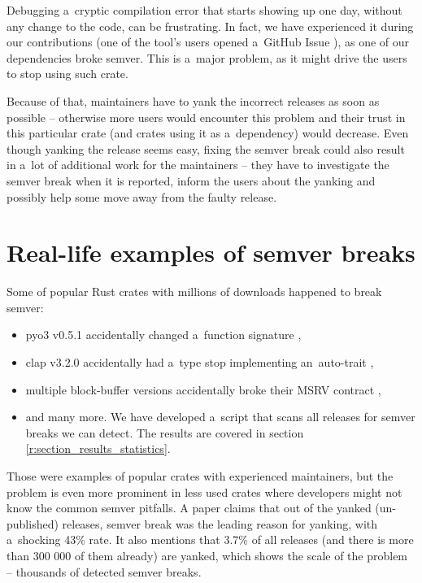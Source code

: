 \documentclass[licencjacka,en]{pracamgr}
\begin{document}
Debugging a~cryptic compilation error that starts showing up one day,
without any change to the code, can be frustrating. In fact, we have experienced it during our
contributions (one of the tool's users opened a~GitHub Issue \cite{issue-compiling-fails}), as one
of our dependencies broke semver. This is a~major problem, as it might drive the users to stop
using such crate.

Because of that, maintainers have to yank the incorrect releases as soon as possible -- otherwise
more users would encounter this problem and their trust in this particular crate (and crates using
it as a~dependency) would decrease. Even though yanking the release seems easy, fixing the semver
break could also result in a~lot of additional work for the maintainers -- they have to investigate
the semver break when it is reported, inform the users about the yanking and possibly help some
move away from the faulty release.

\section{Real-life examples of semver breaks} \label{r:section_real_life_semver_breaks}

Some of popular Rust crates with millions of downloads happened to break semver:
\begin{itemize}
    \item {\ttfamily pyo3 v0.5.1} accidentally changed a~function signature \cite{pyo3-issue},
    \item {\ttfamily clap v3.2.0} accidentally had a~type stop implementing an~auto-trait
		\cite{clap-issue},
    \item multiple {\ttfamily block-buffer} versions accidentally broke their MSRV contract
		\cite{block-buffer-issue},
    \item and many more. We have developed a~script that scans all releases for semver breaks we
		can detect. The results are covered in section \ref{r:section_results_statistics}.
\end{itemize}

Those were examples of popular crates with experienced maintainers, but the problem is even more
prominent in less used crates where developers might not know the common semver pitfalls. A paper
\cite{paper} claims that out of the yanked (un-published) releases, semver break was the leading
reason for yanking, with a~shocking 43\% rate. It also mentions that 3.7\% of all releases
(and there is more than 300 000 of them already) are yanked, which shows the scale of the problem
-- thousands of detected semver breaks.
\end{document}
